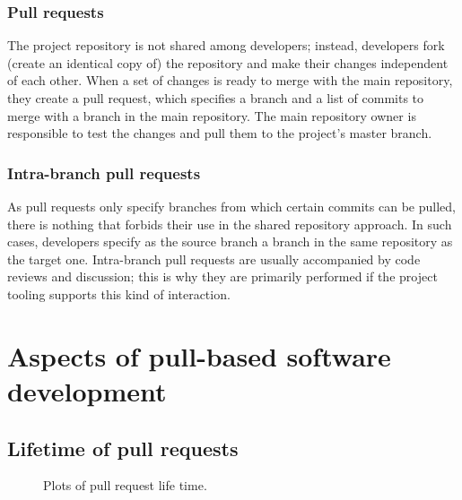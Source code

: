 \documentclass[conference]{IEEEtran}
\begin{document}
\subsubsection{Pull requests} The project repository is not shared among
developers; instead, developers fork (create an identical copy of) the
repository and make their changes independent of each other. When a set of
changes is ready to merge with the main repository, they create a pull request,
which specifies a branch and a list of commits to merge with a branch in the
main repository. The main repository owner is responsible to test the changes
and pull them to the project's master branch. 

\subsubsection{Intra-branch pull requests} As pull requests only specify branches
from which certain commits can be pulled, there is nothing that forbids their
use in the shared repository approach. In such cases, developers specify as the
source branch a branch in the same repository as the target one. Intra-branch
pull requests are usually accompanied by code reviews and discussion; this is
why they are primarily performed if the project tooling supports this kind of
interaction.



\section{Aspects of pull-based software development}

\subsection{Lifetime of pull requests}

\begin{figure*}
\centering
{}
\caption{Plots of pull request life time.}
\end{figure*}
\end{document}
